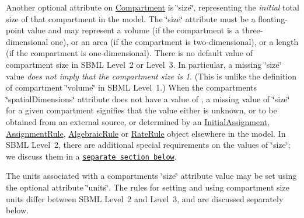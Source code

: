 Another optional attribute on \hyperlink{class_compartment}{Compartment} is \char`\"{}size\char`\"{}, representing the {\itshape initial} total size of that compartment in the model. The \char`\"{}size\char`\"{} attribute must be a floating-\/point value and may represent a volume (if the compartment is a three-\/dimensional one), or an area (if the compartment is two-\/dimensional), or a length (if the compartment is one-\/dimensional). There is no default value of compartment size in S\+B\+ML Level~2 or Level~3. In particular, a missing \char`\"{}size\char`\"{} value {\itshape does not imply that the compartment size is 1}. (This is unlike the definition of compartment \char`\"{}volume\char`\"{} in S\+B\+ML Level~1.) When the compartment\textquotesingle{}s \char`\"{}spatial\+Dimensions\char`\"{} attribute does not have a value of {}, a missing value of \char`\"{}size\char`\"{} for a given compartment signifies that the value either is unknown, or to be obtained from an external source, or determined by an \hyperlink{class_initial_assignment}{Initial\+Assignment}, \hyperlink{class_assignment_rule}{Assignment\+Rule}, \hyperlink{class_algebraic_rule}{Algebraic\+Rule} or \hyperlink{class_rate_rule}{Rate\+Rule} object elsewhere in the model. In S\+B\+ML Level~2, there are additional special requirements on the values of \char`\"{}size\char`\"{}; we discuss them in a \href{#comp-l2}{\tt separate section below}.

The units associated with a compartment\textquotesingle{}s \char`\"{}size\char`\"{} attribute value may be set using the optional attribute \char`\"{}units\char`\"{}. The rules for setting and using compartment size units differ between S\+B\+ML Level~2 and Level~3, and are discussed separately below.

